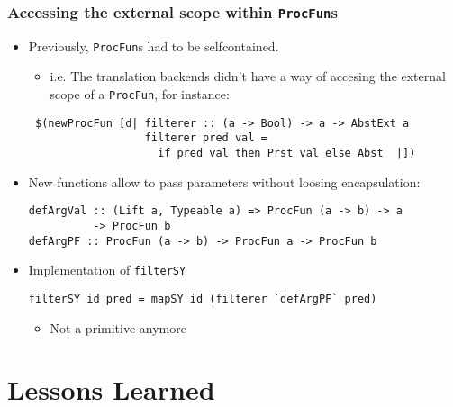 \documentclass{beamer}
\begin{document}
\begin{frame}[fragile]
  \frametitle{Accessing the external scope within \texttt{ProcFun}s}
 \begin{itemize}
 \item Previously, \texttt{ProcFun}s had to be selfcontained.
  \begin{itemize}
  \item i.e. The translation backends didn't have a way of accesing the external scope of a \texttt{ProcFun}, for instance:
  \end{itemize}
   \begin{lstlisting}
 $(newProcFun [d| filterer :: (a -> Bool) -> a -> AbstExt a
                  filterer pred val = 
                    if pred val then Prst val else Abst  |])
   \end{lstlisting}    
 \item<2-> New functions allow to pass parameters without loosing encapsulation:
    \begin{lstlisting}
defArgVal :: (Lift a, Typeable a) => ProcFun (a -> b) -> a 
          -> ProcFun b
defArgPF :: ProcFun (a -> b) -> ProcFun a -> ProcFun b
   \end{lstlisting} 
\item<3-> Implementation of \texttt{filterSY}
\begin{lstlisting}
filterSY id pred = mapSY id (filterer `defArgPF` pred) 
\end{lstlisting}
  \begin{itemize}
  \item Not a primitive anymore
  \end{itemize}
 \end{itemize}
\end{frame}

\section{Lessons Learned}
\end{document}

